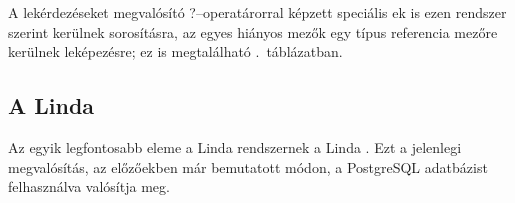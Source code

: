 A lekérdezéseket megvalósító ?--operatárorral képzett speciális \nes{}ek is ezen rendszer szerint kerülnek sorosításra, az egyes hiányos mezők egy \un{}típus referencia mezőre kerülnek leképezésre; ez is megtalálható .~táblázatban.

\def\lend{{\selectlanguage{english}little--endian}}
\def\bend{{\selectlanguage{english}big--endian}}


\subsection{A Linda \ts}\label{subsec:the-lts}

Az egyik legfontosabb eleme a Linda rendszernek a Linda \ts{}.
Ezt a jelenlegi megvalósítás, az előzőekben már bemutatott módon, a PostgreSQL adatbázist felhasználva valósítja meg.

